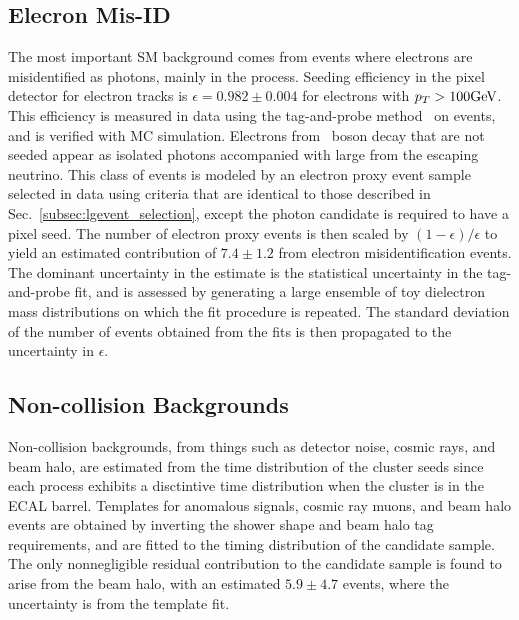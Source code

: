  \subsection{Elecron Mis-ID}
The most important SM background comes from events where
 electrons are misidentified as photons, mainly in the \wen process. 
Seeding efficiency in the pixel detector for
 electron tracks is $\epsilon = 0.982 \pm 0.004$ for
 electrons with $p_T > 100\mathrm{GeV}$. 
This efficiency is measured in data using the
 tag-and-probe method~\cite{Khachatryan:2010xn} on \zee events,
 and is verified with MC simulation. 
Electrons from \w\ boson decay that are not seeded
 appear as isolated photons accompanied with large \met from the escaping neutrino. 
This class of events is modeled by an electron proxy event sample
 selected in data using criteria that are identical to those described in 
 Sec.~\ref{subsec:lgevent_selection}, except the photon candidate is required to have
a pixel seed. 
The number of electron proxy events is then scaled by
 $(1-\epsilon)/\epsilon$ to yield an estimated contribution of $7.4 \pm 1.2$ from
 electron misidentification events. 
The dominant uncertainty in the 
 estimate is the statistical uncertainty in the tag-and-probe fit, 
 and is assessed by generating a large ensemble
 of toy dielectron mass distributions
 on which the fit procedure is repeated. 
The standard deviation of the number
 of \zee events obtained from the fits is then propagated
 to the uncertainty in $\epsilon$.

 \subsection{Non-collision Backgrounds}
Non-collision backgrounds,  from  things such as detector noise,
 cosmic rays, and beam halo, are estimated from the time distribution of the cluster seeds
 since each process exhibits a disctintive time distribution when the cluster is
 in the ECAL barrel. 
Templates for anomalous signals, cosmic ray muons, and beam halo events
 are obtained by inverting the shower shape and beam halo tag requirements,
 and are fitted to the timing distribution of the candidate sample.
The only nonnegligible residual contribution to the candidate sample
 is found to arise from the beam halo, with an estimated $5.9\pm4.7$ events,
 where the uncertainty is from the template fit. 

